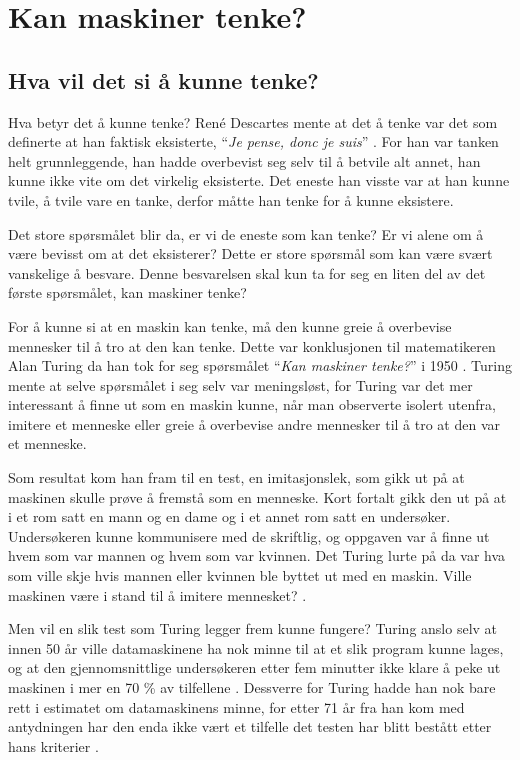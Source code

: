 \section{Kan maskiner tenke?}

\subsection{Hva vil det si å kunne tenke?}

Hva betyr det å kunne tenke?
René Descartes mente at det å tenke var det som definerte at han faktisk eksisterte, ``\textit{Je pense, donc je suis}'' \autocite[30]{Descartes1637}.
For han var tanken helt grunnleggende, 
han hadde overbevist seg selv til å betvile alt annet, han kunne ikke vite om det virkelig eksisterte. 
Det eneste han visste var at han kunne tvile, å tvile vare en tanke, derfor måtte han tenke for å kunne eksistere.

Det store spørsmålet blir da, er vi de eneste som kan tenke? 
Er vi alene om å være bevisst om at det eksisterer? 
Dette er store spørsmål som kan være svært vanskelige å besvare. 
Denne besvarelsen skal kun ta for seg en liten del av det første spørsmålet, 
kan maskiner tenke?

For å kunne si at en maskin kan tenke, må den kunne greie å overbevise mennesker til å tro at den kan tenke. Dette var konklusjonen til matematikeren Alan Turing da han tok for seg spørsmålet ``\textit{Kan maskiner tenke?}'' i 1950 \autocite{Kiran2013}. 
Turing mente at selve spørsmålet i seg selv var meningsløst, for Turing var det mer interessant å finne ut som en maskin kunne, når man observerte isolert utenfra, imitere et menneske eller greie å overbevise andre mennesker til å tro at den var et menneske.

Som resultat kom han fram til en test, en imitasjonslek, som gikk ut på at maskinen skulle prøve å fremstå som en menneske.
Kort fortalt gikk den ut på at i et rom satt en mann og en dame og i et annet rom satt en undersøker. 
Undersøkeren kunne kommunisere med de skriftlig, og oppgaven var å finne ut hvem som var mannen og hvem som var kvinnen.
Det Turing lurte på da var hva som ville skje hvis mannen eller kvinnen ble byttet ut med en maskin. 
Ville maskinen være i stand til å imitere mennesket?
\autocite[433-434]{Turing1950}.

Men vil en slik test som Turing legger frem kunne fungere? Turing anslo selv at innen 50 år ville datamaskinene ha nok minne til at et slik program kunne lages,
og at den gjennomsnittlige undersøkeren etter fem minutter ikke klare å peke ut maskinen i mer en 70 \% av tilfellene \autocite[442]{Turing1950}. 
Dessverre for Turing hadde han nok bare rett i estimatet om datamaskinens minne, for etter 71 år fra han kom med antydningen har den enda ikke vært et tilfelle det testen har blitt bestått etter hans kriterier \autocites[5]{Kiran2013}[]{turingTest}.

